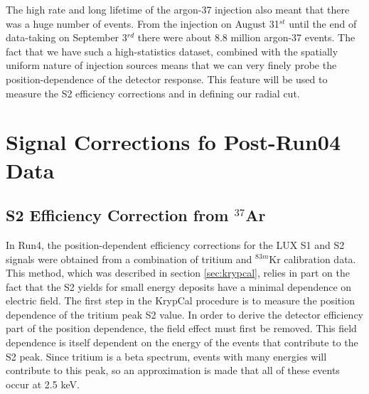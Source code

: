 The high rate and long lifetime of the argon-37 injection also meant that there was a huge number of events. From the injection on August 31$^{st}$ until the end of data-taking on September 3$^{rd}$ there were about 8.8 million argon-37 events. The fact that we have such a high-statistics dataset, combined with the spatially uniform nature of injection sources means that we can very finely probe the position-dependence of the detector response. This feature will be used to measure the S2 efficiency corrections and in defining our radial cut.


\section{Signal Corrections fo Post-Run04 Data}\label{sec:corrections}

\subsection{S2 Efficiency Correction from $^{37}$Ar}\label{sec:s2corr}
In Run4, the position-dependent efficiency corrections for the LUX S1 and S2 signals were obtained from a combination of tritium and $^{83m}$Kr calibration data. This method, which was described in section \ref{sec:krypcal}, relies in part on the fact that the S2 yields for small energy deposits have a minimal dependence on electric field. The first step in the KrypCal procedure is to measure the position dependence of the tritium peak S2 value. In order to derive the detector efficiency part of the position dependence, the field effect must first be removed. This field dependence is itself dependent on the energy of the events that contribute to the S2 peak. Since tritium is a beta spectrum, events with many energies will contribute to this peak, so an approximation is made that all of these events occur at 2.5 keV.

